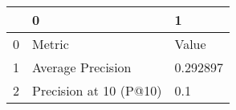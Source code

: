 \begin{tabular}{lll}
\toprule
{} &                       0 &         1 \\
\midrule
0 &                  Metric &     Value \\
1 &       Average Precision &  0.292897 \\
2 &  Precision at 10 (P@10) &       0.1 \\
\bottomrule
\end{tabular}
